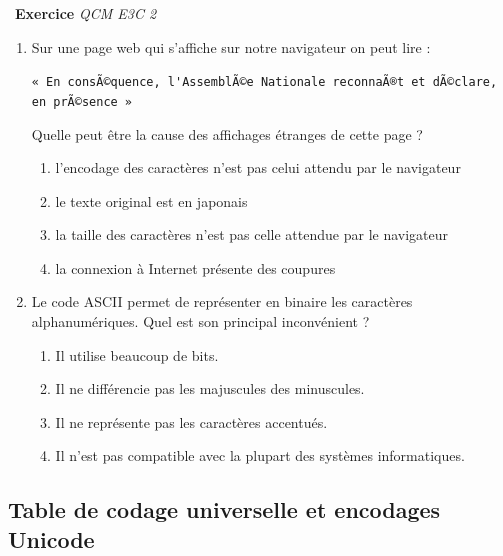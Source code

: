 \documentclass[a4paper, french, 12pt]{article}  %
\newcounter{exo}
\newenvironment{exercice}[1]
{\par \medskip   \addtocounter{exo}{1} \noindent  
\begin{bclogo}[arrondi =0.1,   noborder = true, logo=\bccrayon, marge=4]{~\textbf{Exercice} \textbf{\theexo} {\itshape #1} }  \par}
{
\end{bclogo}
 \par \bigskip }
\begin{document}
\begin{exercice}{QCM E3C 2}

\begin{enumerate}
 \item Sur une page web qui s'affiche sur notre navigateur on peut lire :

\verb+« En consÃ©quence, l'AssemblÃ©e Nationale reconnaÃ®t et dÃ©clare, en prÃ©sence »+

Quelle peut être la cause des affichages étranges de cette page ?

\begin{enumerate}
	\item l'encodage des caractères n'est pas celui attendu par le navigateur
	\item le texte original est en japonais
	\item  la taille des caractères n'est pas celle attendue par le navigateur
	\item la connexion à Internet présente des coupures
\end{enumerate}
 
 \item Le code ASCII permet de représenter en binaire les caractères alphanumériques. Quel est son principal inconvénient ?

\begin{enumerate}
	\item  Il utilise beaucoup de bits.
	\item Il ne différencie pas les majuscules des minuscules.
	\item Il ne représente pas les caractères accentués.
	\item Il n'est pas compatible avec la plupart des systèmes informatiques.

\end{enumerate}
\end{enumerate}



\end{exercice}

\vspace*{-20pt}

\subsection{Table de codage universelle et encodages Unicode}

\vspace*{-20pt}
\end{document}
